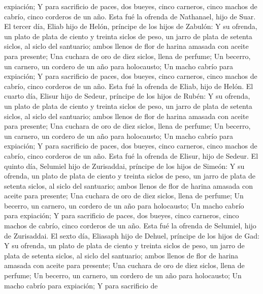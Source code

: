 expiación;  Y para sacrificio de paces, dos bueyes, cinco
carneros, cinco machos de cabrío, cinco corderos de un año. Esta fué la
ofrenda de Nathanael, hijo de Suar.  El tercer día, Eliab
hijo de Helón, príncipe de los hijos de Zabulón:  Y su
ofrenda, un plato de plata de ciento y treinta siclos de peso, un jarro
de plata de setenta siclos, al siclo del santuario; ambos llenos de flor
de harina amasada con aceite para presente;  Una cuchara de
oro de diez siclos, llena de perfume;  Un becerro, un
carnero, un cordero de un año para holocausto;  Un macho
cabrío para expiación;  Y para sacrificio de paces, dos
bueyes, cinco carneros, cinco machos de cabrío, cinco corderos de un
año. Esta fué la ofrenda de Eliab, hijo de Helón.  El
cuarto día, Elisur hijo de Sedeur, príncipe de los hijos de Rubén:
 Y su ofrenda, un plato de plata de ciento y treinta siclos
de peso, un jarro de plata de setenta siclos, al siclo del santuario;
ambos llenos de flor de harina amasada con aceite para presente;
 Una cuchara de oro de diez siclos, llena de perfume;
 Un becerro, un carnero, un cordero de un año para
holocausto;  Un macho cabrío para expiación; 
Y para sacrificio de paces, dos bueyes, cinco carneros, cinco machos de
cabrío, cinco corderos de un año. Esta fué la ofrenda de Elisur, hijo de
Sedeur.  El quinto día, Selumiel hijo de Zurisaddai,
príncipe de los hijos de Simeón:  Y su ofrenda, un plato de
plata de ciento y treinta siclos de peso, un jarro de plata de setenta
siclos, al siclo del santuario; ambos llenos de flor de harina amasada
con aceite para presente;  Una cuchara de oro de diez
siclos, llena de perfume;  Un becerro, un carnero, un
cordero de un año para holocausto;  Un macho cabrío para
expiación;  Y para sacrificio de paces, dos bueyes, cinco
carneros, cinco machos de cabrío, cinco corderos de un año. Esta fué la
ofrenda de Selumiel, hijo de Zurisaddai.  El sexto día,
Eliasaph hijo de Dehuel, príncipe de los hijos de Gad:  Y
su ofrenda, un plato de plata de ciento y treinta siclos de peso, un
jarro de plata de setenta siclos, al siclo del santuario; ambos llenos
de flor de harina amasada con aceite para presente;  Una
cuchara de oro de diez siclos, llena de perfume;  Un
becerro, un carnero, un cordero de un año para holocausto; 
Un macho cabrío para expiación;  Y para sacrificio de

